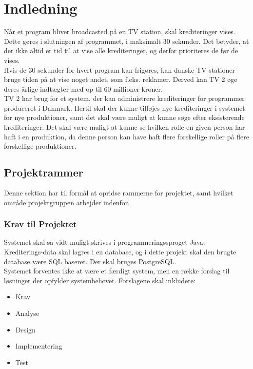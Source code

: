\section{Indledning}
Når et program bliver broadcasted på en TV station, skal krediteringer vises. Dette gøres i slutningen af programmet, i maksimalt 30 sekunder. Det betyder, at der ikke altid er tid til at vise alle krediteringer, og derfor prioriteres de før de vises. \\
Hvis de 30 sekunder for hvert program kan frigøres, kan danske TV stationer bruge tiden på at vise noget andet, som f.eks. reklamer. Derved kan TV 2 øge deres årlige indtægter med op til 60 millioner kroner. \\
TV 2 har brug for et system, der kan administrere krediteringer for programmer produceret i Danmark. Hertil skal der kunne tilføjes nye krediteringer i systemet for nye produktioner, samt det skal være muligt at kunne søge efter eksisterende krediteringer. Det skal være muligt at kunne se hvilken rolle en given person har haft i en produktion, da denne person kan have haft flere forskellige roller på flere forskellige produktioner.

\subsection{Projektrammer}
Denne sektion har til formål at opridse rammerne for projektet, samt hvilket område projektgruppen arbejder indenfor.

\subsubsection{Krav til Projektet}
Systemet skal så vidt muligt skrives i programmeringssproget Java. \\
Krediterings-data skal lagres i en database, og i dette projekt skal den brugte database være SQL baseret. Der skal bruges PostgreSQL.\\
Systemet forventes ikke at være et færdigt system, men en række forslag til løsninger der opfylder systembehovet. Forslagene skal inkludere:

\begin{itemize}
    \item Krav
    \item Analyse
    \item Design
    \item Implementering
    \item Test
\end{itemize}


